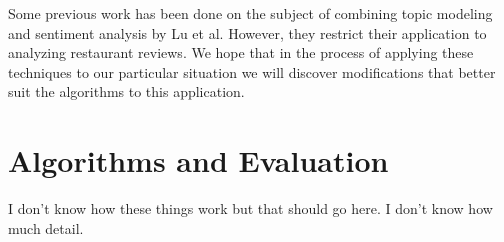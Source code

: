 \documentclass{sig-alternate-05-2015}
\begin{document}
Some previous work has been done on the subject of combining topic modeling and
sentiment analysis by Lu et al.\cite{lu:2011} However, they restrict their application to analyzing
restaurant reviews. We hope that in the process of applying these techniques to our
particular situation we will discover modifications that better suit the algorithms
to this application.

\section{Algorithms and Evaluation}
I don't know how these things work but that should go here. I don't know
how much detail.


%
%

%
%

%
%




%

%
%
\end{document}
